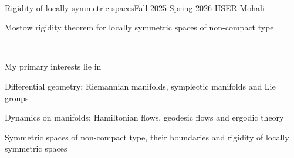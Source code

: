 \documentclass{LoLaTeXcv}
\begin{document}



\

\begin{lltxJob}{\href{https://dub.sh/thesisms}{Rigidity of locally symmetric spaces}}{Fall 2025-Spring 2026}{ IISER Mohali}
	\item Mostow rigidity theorem for locally symmetric spaces of non-compact type
\end{lltxJob}




\

My primary interests lie in

\begin{lltxItemize}
	\item Differential geometry: Riemannian manifolds, symplectic manifolds and Lie groups
	\item Dynamics on manifolds: Hamiltonian flows, geodesic flows and ergodic theory
	\item Symmetric spaces of non-compact type, their boundaries and rigidity of locally symmetric spaces
\end{lltxItemize}
\end{document}

